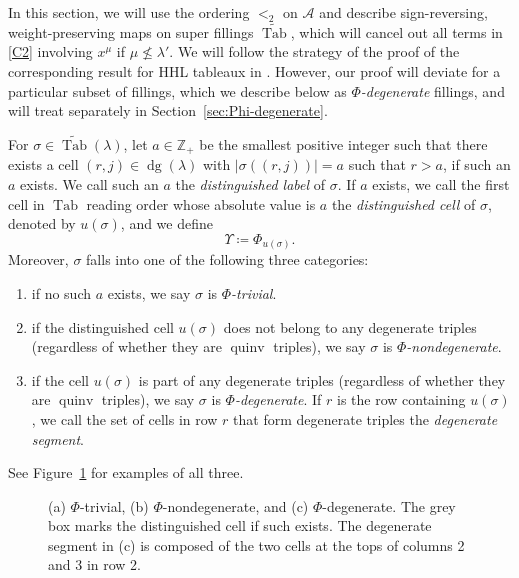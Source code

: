 \documentclass[11pt]{article}
\theoremstyle{definition}
\numberwithin{equation}{section}
\DeclareMathOperator{\PQT}{Tab}
\DeclareMathOperator{\dg}{dg}
\DeclareMathOperator{\quinv}{quinv}
\newcommand\cell[3]{
\def\i{#1} \def\j{#2} \def\entry{#3}

\draw (\j-1,-\i)--(\j,-\i)--(\j,-\i+1)--(\j-1,-\i+1)--(\j-1,-\i);
\node at (\j-.5,-\i+.5) {\entry};
}
\newcommand\graycell[3]{
\def\i{#1} \def\j{#2} \def\entry{#3}
\draw[fill=gray!60](\j-1,-\i)--(\j,-\i)--(\j,-\i+1)--(\j-1,-\i+1)--(\j-1,-\i);
\node at (\j-.5,-\i+.5) {\entry};
}
\begin{document}
In this section, we will use the ordering $<_2$ on $\mathcal{A}$ and describe sign-reversing, weight-preserving maps on super fillings $\widetilde{\PQT}$, which will cancel out all terms in \eqref{C2} involving $x^{\mu}$ if $\mu \not\leq \lambda'$. We will follow the strategy of the proof of the corresponding result for HHL tableaux in \cite[Section 5.2]{HHL05}. 
However, our proof will deviate for a particular subset of fillings, which we describe below as \emph{$\Phi$-degenerate} fillings, and will treat separately in Section~\ref{sec:Phi-degenerate}.

\begin{defn}
For $\sigma\in\widetilde{\PQT}(\lambda)$, let $a\in\mathbb{Z}_+$ be the smallest positive integer such that there exists a cell $(r,j)\in\dg(\lambda)$ with $|\sigma((r,j))|=a$ such that $r>a$, if such an $a$ exists. We call such an $a$ the \emph{distinguished label} of $\sigma$. 
If $a$ exists, we call the first cell in $\PQT$ reading order whose absolute value is $a$ the \emph{distinguished cell} of $\sigma$, denoted by $u(\sigma)$, and we define 
\[\Upsilon\coloneqq\Phi_{u(\sigma)}.
\]
Moreover, $\sigma$ falls into one of the following three categories:
\begin{enumerate}[label=(\alph*),leftmargin=20pt]
\item if no such $a$ exists, we say $\sigma$ is \emph{$\Phi$-trivial}.
\item if the distinguished cell $u(\sigma)$ does not belong to any degenerate triples \textup{(}regardless of whether they are $\quinv$ triples\textup{)}, we say $\sigma$ is \emph{$\Phi$-nondegenerate}.
\item if the cell $u(\sigma)$ is part of any degenerate triples \textup{(}regardless of whether they are $\quinv$ triples\textup{)}, we say $\sigma$ is \emph{$\Phi$-degenerate}. If $r$ is the row containing $u(\sigma)$, we call the set of cells in row $r$ that form degenerate triples the \emph{degenerate segment}.
\end{enumerate}
See Figure~\ref{fig:degenerate} for examples of all three.
\end{defn}

\begin{figure}[h]
\centering
{}
\quad
{}
\quad
{}
\caption{(a) $\Phi$-trivial, (b) $\Phi$-nondegenerate, and (c) $\Phi$-degenerate. The grey box marks the distinguished cell if such exists. The degenerate segment in (c) is composed of the two cells at the tops of columns 2 and 3 in row 2.}\label{fig:degenerate}
\end{figure}
\end{document}
